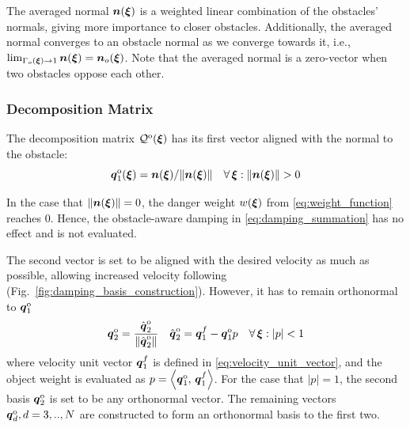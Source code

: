 The averaged normal $\boldsymbol{n}(\boldsymbol{\xi})$ is a weighted linear combination of the obstacles' normals, giving more importance to closer obstacles.
Additionally, the averaged normal converges to an obstacle normal as we converge towards it, i.e., $\lim_{\Gamma_o(\boldsymbol{\xi}) \rightarrow 1} \boldsymbol{n}(\boldsymbol{\xi}) = \boldsymbol{n}_o(\boldsymbol{\xi})$.
Note that the averaged normal is a zero-vector when two obstacles oppose each other. 

\subsubsection{Decomposition Matrix}
The decomposition matrix $\mathcal{Q}^{\mathrm{o}}(\boldsymbol{\xi})$ has its first vector aligned with the normal to the obstacle: 
\begin{equation}
    \vecs q_1^{\mathrm{o}}(\vecs\xi) =  \vecs n(\vecs\xi) / \lVert\vecs n(\vecs\xi)\rVert 
    \quad \forall \, \vecs \xi : \lVert\vecs n(\vecs\xi)\rVert  > 0
    \label{eq:first_obstacle_basis}
\end{equation}

In the case that $\lVert\boldsymbol{n}(\boldsymbol{\xi})\rVert = 0$, the danger weight $w(\boldsymbol{\xi})$ from \eqref{eq:weight_function} reaches 0. Hence, the obstacle-aware damping in \eqref{eq:damping_summation} has no effect and is not evaluated.

The second vector is set to be aligned with the desired velocity as much as possible, allowing increased velocity following (Fig.~\ref{fig:damping_basis_construction}). However, it has to remain orthonormal to $\boldsymbol{q}_1^{\mathrm{o}}$
\begin{equation}
  \boldsymbol{q}_2^{\mathrm{o}} = \frac{\hat{\boldsymbol{q}}_2^{\mathrm{o}}}{\| \hat{\boldsymbol{q}}_2^{\mathrm{o}} \|}
  \quad
  \hat{\boldsymbol{q}}_2^{\mathrm{o}} = \boldsymbol{q}_1^{f} - \boldsymbol{q}_1^{\mathrm{o}} p \quad  \forall \, \boldsymbol{\xi} : | p | < 1
\end{equation}
where velocity unit vector $\boldsymbol{q}_1^{f}$ is defined in \eqref{eq:velocity_unit_vector}, and the object weight is evaluated as $p = \left\langle {\boldsymbol{q}_1^{\mathrm{o}}}, \, {\boldsymbol{q}_1^{f}} \right\rangle$. 
For the case that $| p | = 1$, the second basis $\boldsymbol{q}_2^{\mathrm{o}}$ is set to be any orthonormal vector. The remaining vectors $\boldsymbol{q}_d^{\mathrm{o}}, d = 3, .., N$ are constructed to form an orthonormal basis to the first two.

